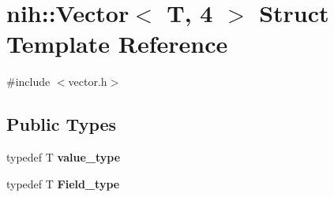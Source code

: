 \hypertarget{structnih_1_1_vector_3_01_t_00_014_01_4}{
\section{nih\-:\-:\-Vector$<$ \-T, 4 $>$ \-Struct \-Template \-Reference}
\label{structnih_1_1_vector_3_01_t_00_014_01_4}
}


{\ttfamily \#include $<$vector.\-h$>$}

\subsection*{\-Public \-Types}
\begin{DoxyCompactItemize}
\item 
\hypertarget{structnih_1_1_vector_3_01_t_00_014_01_4_aac8b261630e160164bae5f165a99db86}{
typedef \-T {\bfseries value\-\_\-type}}
\label{structnih_1_1_vector_3_01_t_00_014_01_4_aac8b261630e160164bae5f165a99db86}

\item 
\hypertarget{structnih_1_1_vector_3_01_t_00_014_01_4_a4b24118722abe4a57bcabe8d2df475fd}{
typedef \-T {\bfseries \-Field\-\_\-type}}
\label{structnih_1_1_vector_3_01_t_00_014_01_4_a4b24118722abe4a57bcabe8d2df475fd}

\end{DoxyCompactItemize}
